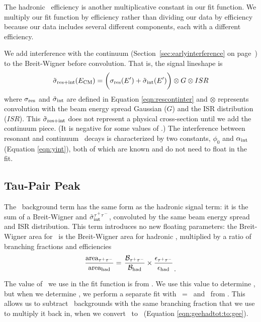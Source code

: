 \documentclass{cornell}
\begin{document}
The hadronic \ups\ efficiency is another multiplicative constant in
our fit function.  We multiply our fit function by efficiency rather
than dividing our data by efficiency because our data includes several
different components, each with a different efficiency.

We add interference with the continuum
(Section~\ref{sec:earlyinterference} on
page~\pageref{sec:earlyinterference}) to the Breit-Wigner before
convolution.  That is, the signal lineshape is
\begin{equation}
  \tilde{\sigma}_{{\mbox{\scriptsize res}}+{\mbox{\scriptsize int}}}(E_{\mbox{\scriptsize CM}}) = \bigg(
  \sigma_{\mbox{\scriptsize res}}(E') +
  \tilde{\sigma}_{\mbox{\scriptsize int}}(E') \bigg) \otimes G \otimes ISR
\end{equation}
where $\sigma_{\mbox{\scriptsize res}}$ and $\tilde{\sigma}_{\mbox{\scriptsize int}}$ are defined
in Equation \ref{eqn:rescontinter} and $\otimes$ represents
convolution with the beam energy spread Gaussian ($G$) and the ISR
distribution ($ISR$).  This $\tilde{\sigma}_{{\mbox{\scriptsize res}}+{\mbox{\scriptsize int}}}$
does not represent a physical cross-section until we add the continuum
piece.  (It is negative for some values of \ecm.)  The interference
between resonant and continuum \qqbar\ decays is characterized by two
constants, $\phi_0$ and $\alpha_{\mbox{\scriptsize int}}$ (Equation \ref{eqn:yint}),
both of which are known and do not need to float in the fit.

\subsection{Tau-Pair Peak}

The \tautau\ background term has the same form as the hadronic signal
term: it is the sum of a Breit-Wigner and $\tilde{\sigma}_{\mbox{\scriptsize int}}^{\tau^+\tau^-}$,
convoluted by the same beam energy spread and ISR distribution.  This
term introduces no new floating parameters: the Breit-Wigner area for
\tautau\ is the Breit-Wigner area for hadronic \ups, multiplied by a
ratio of branching fractions and efficiencies
\begin{equation}
  \frac{\mbox{area}_{\tau^+\tau^-}}{\mbox{area}_{\mbox{\scriptsize had}}} = \left.
  \frac{{\mathcal B}_{\tau^+\tau^-}}{{\mathcal B}_{\mbox{\scriptsize had}}} \times
  \frac{\epsilon_{\tau^+\tau^-}}{\epsilon_{\mbox{\scriptsize had}}} \right._{\mbox{.}}
\end{equation}

The value of \btt\ we use in the fit function is from \cite{jean}.  We
use this value to determine \geehadtot, but when we determine \gee, we
perform a separate fit with \btt\ = \bmm\ and \bmm\ from
\cite{istvan}.  This allows us to subtract \tautau\ backgrounds with
the same branching fraction that we use to multiply it back in, when
we convert \geehadtot\ to \gee\ (Equation \ref{eqn:geehadtot:to:gee}).
\end{document}
